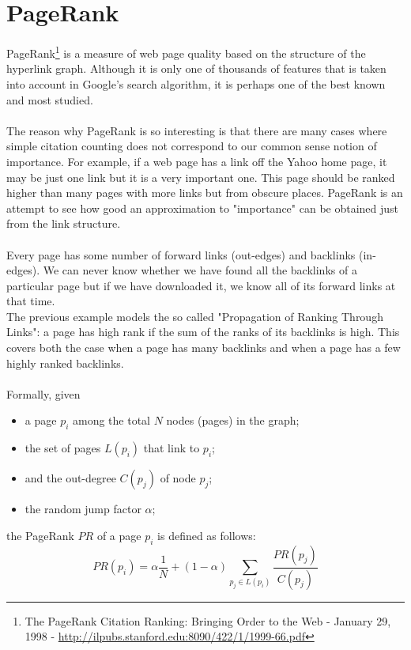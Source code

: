 \documentclass[11pt,a4paper]{article}
\begin{document}
\section{PageRank}
PageRank\footnote{The PageRank Citation Ranking: Bringing Order to the Web - January 29, 1998 - \url{http://ilpubs.stanford.edu:8090/422/1/1999-66.pdf}} is a measure of web page quality based on the structure of the hyperlink graph. Although it is only one of thousands of features that is taken into account in Google's search algorithm, it is perhaps one of the best known and most studied.\\
\\
The reason why PageRank is so interesting is that there are many cases where simple citation counting does not correspond to our common sense notion of importance. For example, if a web page has a link off the Yahoo home page, it may be just one link but it is a very important one. This page should be ranked higher than many pages with more links but from obscure places. PageRank is an attempt to see how good an approximation to "importance" can be obtained just from the link structure.\\
\\
Every page has some number of forward links (out-edges) and backlinks (in-edges). We can never know whether we have found all the backlinks of a particular page but if we have downloaded it, we know all of its forward links at that time.\\
The previous example models the so called "Propagation of Ranking Through Links": a page has high rank if the sum of the ranks of its backlinks is high. This covers both the case when a page has many backlinks and when a page has a few highly ranked backlinks.\\
\\
Formally, given
\begin{itemize}
    \item a page $p_i$ among the total $N$ nodes (pages) in the graph;
    \item the set of pages $L(p_i)$ that link to $p_i$;
    \item and the out-degree $C(p_j)$ of node $p_j$;
    \item the random jump factor $\alpha$;
\end{itemize}
the PageRank $PR$ of a page $p_i$ is defined as follows:
$$PR(p_i) = \alpha \frac{1}{N} + (1 - \alpha) \sum_{p_j \in L(p_i)}\frac{PR(p_j)}{C(p_j)}$$
\end{document}
